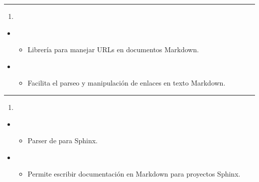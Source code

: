 \documentclass[a4paper,10pt,spanish]{sphinxmanual}
\begin{document}
\bigskip\hrule\bigskip

\begin{enumerate}
%
\setcounter{enumi}{12}
\item {} 
\sphinxAtStartPar
{}

\end{enumerate}
\begin{itemize}
\item {} 
\sphinxAtStartPar
{}
\begin{itemize}
\item {} 
\sphinxAtStartPar
Librería para manejar URLs en documentos Markdown.

\end{itemize}

\item {} 
\sphinxAtStartPar
{}
\begin{itemize}
\item {} 
\sphinxAtStartPar
Facilita el parseo y manipulación de enlaces en texto Markdown.

\end{itemize}

\end{itemize}


\bigskip\hrule\bigskip

\begin{enumerate}
%
\setcounter{enumi}{13}
\item {} 
\sphinxAtStartPar
{}

\end{enumerate}
\begin{itemize}
\item {} 
\sphinxAtStartPar
{}
\begin{itemize}
\item {} 
\sphinxAtStartPar
Parser de  para Sphinx.

\end{itemize}

\item {} 
\sphinxAtStartPar
{}
\begin{itemize}
\item {} 
\sphinxAtStartPar
Permite escribir documentación en Markdown para proyectos Sphinx.

\end{itemize}

\end{itemize}
\end{document}
